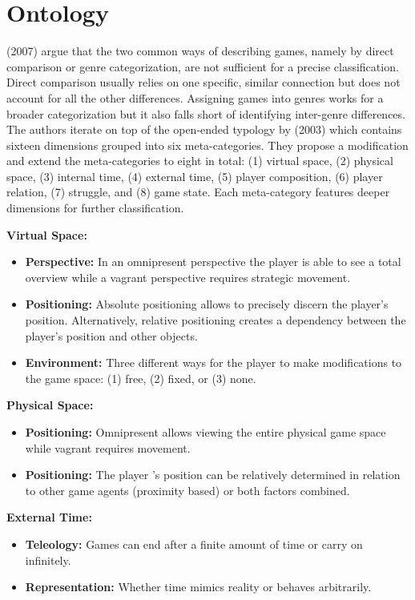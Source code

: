 \section{Ontology} \label{sec:ontology}
\citeauthor{Elverdam2007} (2007) argue that the two common ways of describing games, namely by direct comparison or genre categorization, are not sufficient for a precise classification.
Direct comparison usually relies on one specific, similar connection but does not account for all the other differences.
Assigning games into genres works for a broader categorization but it also falls short of identifying inter-genre differences.
The authors iterate on top of the open-ended typology by \citeauthor{Aarseth2003} (2003) which contains sixteen dimensions grouped into six meta-categories.
They propose a modification and extend the meta-categories to eight in total: (1) virtual space, (2) physical space, (3) internal time, (4) external time, (5) player composition, (6) player relation, (7) struggle, and (8) game state.
Each meta-category features deeper dimensions for further classification.

\textbf{Virtual Space:}
\begin{itemize}
    \item \textbf{Perspective:} In an omnipresent perspective the player is able to see a total overview while a vagrant perspective requires strategic movement.
    \item \textbf{Positioning:} Absolute positioning allows to precisely discern the player's position. Alternatively, relative positioning creates a dependency between the player's position and other objects.
    \item \textbf{Environment:} Three different ways for the player to make modifications to the game space: (1) free, (2) fixed, or (3) none.
\end{itemize}

\textbf{Physical Space:}
\begin{itemize}
    \item \textbf{Positioning:} Omnipresent allows viewing the entire physical game space while vagrant requires movement.
    \item \textbf{Positioning:} The player 's position can be relatively determined in relation to other game agents (proximity based) or both factors combined.
\end{itemize}

\textbf{External Time:}
\begin{itemize}
    \item \textbf{Teleology:} Games can end after a finite amount of time or carry on infinitely.
    \item \textbf{Representation:} Whether time mimics reality or behaves arbitrarily.
\end{itemize}

